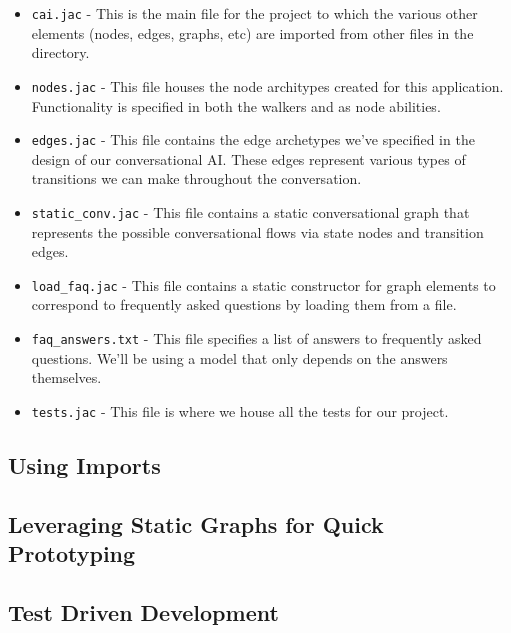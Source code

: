 \begin{itemize}
    \item \texttt{cai.jac} - This is the main file for the project to which the various other elements (nodes, edges, graphs, etc) are imported from other files in the directory.
    \item \texttt{nodes.jac} - This file houses the node architypes created for this application. Functionality is specified in both the walkers and as node abilities.
    \item \texttt{edges.jac} - This file contains the edge archetypes we've specified in the design of our conversational AI. These edges represent various types of transitions we can make throughout the conversation.
    \item \texttt{static\_conv.jac} - This file contains a static conversational graph that represents the possible conversational flows via state nodes and transition edges.
    \item \texttt{load\_faq.jac} - This file contains a static constructor for graph elements to correspond to frequently asked questions by loading them from a file.
    \item \texttt{faq\_answers.txt} - This file specifies a list of answers to frequently asked questions. We'll be using a model that only depends on the answers themselves.
    \item \texttt{tests.jac} - This file is where we house all the tests for our project.
\end{itemize}

\subsection{Using Imports}




\subsection{Leveraging Static Graphs for Quick Prototyping}

\subsection{Test Driven Development}

